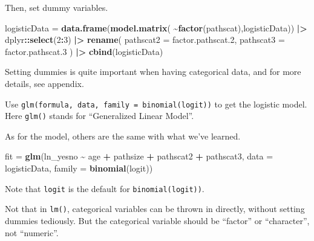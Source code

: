 \documentclass[
]{ctexart}
\newenvironment{Shaded}{\begin{snugshade}}{\end{snugshade}}
\newcommand{\AttributeTok}[1]{\textcolor[rgb]{0.13,0.29,0.53}{#1}}
\newcommand{\DecValTok}[1]{\textcolor[rgb]{0.00,0.00,0.81}{#1}}
\newcommand{\FloatTok}[1]{\textcolor[rgb]{0.00,0.00,0.81}{#1}}
\newcommand{\FunctionTok}[1]{\textcolor[rgb]{0.13,0.29,0.53}{\textbf{#1}}}
\newcommand{\NormalTok}[1]{#1}
\newcommand{\OtherTok}[1]{\textcolor[rgb]{0.56,0.35,0.01}{#1}}
\newcommand{\SpecialCharTok}[1]{\textcolor[rgb]{0.81,0.36,0.00}{\textbf{#1}}}
\newcommand{\StringTok}[1]{\textcolor[rgb]{0.31,0.60,0.02}{#1}}
\begin{document}
Then, set dummy variables.

\begin{Shaded}
\begin{Highlighting}[]
\NormalTok{logisticData }\OtherTok{=} \FunctionTok{data.frame}\NormalTok{(}\FunctionTok{model.matrix}\NormalTok{(}
    \SpecialCharTok{\textasciitilde{}}\FunctionTok{factor}\NormalTok{(pathscat),logisticData)) }\SpecialCharTok{|\textgreater{}} 
\NormalTok{  dplyr}\SpecialCharTok{::}\FunctionTok{select}\NormalTok{(}\DecValTok{2}\SpecialCharTok{:}\DecValTok{3}\NormalTok{) }\SpecialCharTok{|\textgreater{}} 
  \FunctionTok{rename}\NormalTok{(}
    \AttributeTok{pathscat2 =}\NormalTok{ factor.pathscat}\FloatTok{.2}\NormalTok{,}
    \AttributeTok{pathscat3 =}\NormalTok{ factor.pathscat}\FloatTok{.3}
\NormalTok{  ) }\SpecialCharTok{|\textgreater{}}
  \FunctionTok{cbind}\NormalTok{(logisticData)}
\end{Highlighting}
\end{Shaded}

Setting dummies is quite important when having categorical data, and for
more details, see appendix.

Use
\texttt{glm(formula,\ data,\ family\ =\ binomial(\textquotesingle{}logit\textquotesingle{}))}
to get the logistic model. Here \texttt{glm()} stands for ``Generalized
Linear Model''.

As for the model, others are the same with what we've learned.

\begin{Shaded}
\begin{Highlighting}[]
\NormalTok{fit }\OtherTok{=} \FunctionTok{glm}\NormalTok{(ln\_yesno }\SpecialCharTok{\textasciitilde{}}\NormalTok{ age }\SpecialCharTok{+}\NormalTok{ pathsize }\SpecialCharTok{+}\NormalTok{ pathscat2 }\SpecialCharTok{+}\NormalTok{ pathscat3,}
          \AttributeTok{data =}\NormalTok{ logisticData,}
          \AttributeTok{family =} \FunctionTok{binomial}\NormalTok{(}\StringTok{\textquotesingle{}logit\textquotesingle{}}\NormalTok{))}
\end{Highlighting}
\end{Shaded}

Note that \texttt{\textquotesingle{}logit\textquotesingle{}} is the
default for
\texttt{binomial(\textquotesingle{}logit\textquotesingle{}))}.

Not that in \texttt{lm()}, categorical variables can be thrown in
directly, without setting dummies tediously. But the categorical
variable should be ``factor'' or ``character'', not ``numeric''.
\end{document}
